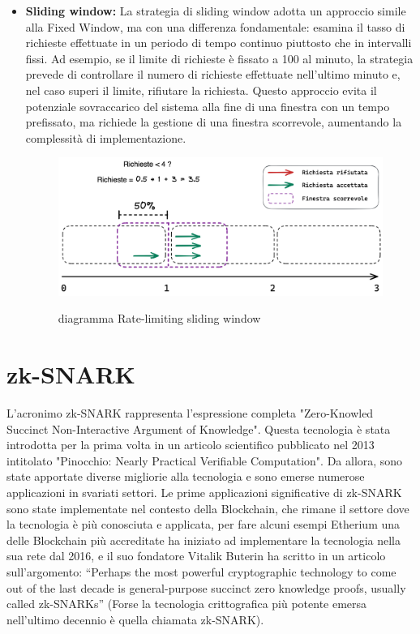 \begin{itemize}
    \item \textbf{Sliding window:} La strategia di sliding window adotta un approccio simile alla Fixed Window, ma con
    una differenza fondamentale: esamina il tasso di richieste effettuate in un periodo di tempo continuo piuttosto che
    in intervalli fissi. Ad esempio, se il limite di richieste è fissato a 100 al minuto, la strategia prevede di
    controllare il numero di richieste effettuate nell'ultimo minuto e, nel caso superi il limite, rifiutare la
    richiesta. Questo approccio evita il potenziale sovraccarico del sistema alla fine di una finestra con un tempo
    prefissato, ma richiede la gestione di una finestra scorrevole, aumentando la complessità di
    implementazione.\begin{figure}[H]
        \centering
        \includegraphics[width=12cm]{./immagini/mieimmagini/sliding_window.png}
        \label{sliding window diagram}
        \caption{diagramma Rate-limiting sliding window }
        \end{figure}
\end{itemize}
\clearpage

\section{zk-SNARK}
\label{sec:zk-SNARK}
L'acronimo zk-SNARK rappresenta l'espressione completa "Zero-Knowled Succinct Non-Interactive Argument of Knowledge".
Questa tecnologia è stata introdotta per la prima volta in un articolo scientifico pubblicato nel 2013 intitolato
"Pinocchio: Nearly Practical Verifiable Computation". Da allora, sono state apportate diverse migliorie alla tecnologia
e sono emerse numerose applicazioni in svariati settori. Le prime applicazioni significative di zk-SNARK sono state
implementate nel contesto della Blockchain, che rimane il settore dove la tecnologia è più conosciuta e applicata, per
fare alcuni esempi Etherium una delle Blockchain più accreditate  ha iniziato ad implementare la tecnologia nella sua
rete dal 2016, e il suo fondatore Vitalik Buterin ha scritto in un articolo sull’argomento: “Perhaps the most powerful
cryptographic technology to come out of the last decade is general-purpose succinct zero knowledge proofs, usually
called zk-SNARKs” (Forse la tecnologia crittografica più potente emersa nell'ultimo decennio è quella chiamata
zk-SNARK).

